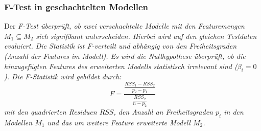 \subsubsection{F-Test in geschachtelten Modellen}
Der \it{F-Test} überprüft, ob zwei verschachtelte Modelle mit den Featuremengen $M_1 \subseteq M_2$ sich signifikant unterscheiden.
Hierbei wird auf den gleichen Testdaten evaluiert.
Die Statistik ist F-verteilt und abhängig von den Freiheitsgraden (Anzahl der Features im Modell).
Es wird die Nullhypothese überprüft, ob die hinzugefügten Features des erweiterten Modells statistisch irrelevant sind ($\beta_i = 0$).
Die F-Statistik wird gebildet durch:
\begin{equation}
	F=\frac{\frac{RSS_1-RSS_2}{p_2-p_1}}{\frac{RSS_2}{n-p_2}}
\end{equation}
mit den quadrierten Residuen $RSS$, den Anzahl an Freiheitsgraden $p_i$ in den Modellen $M_1$ und das um  weitere Feature erweiterte Modell $M_2$.
